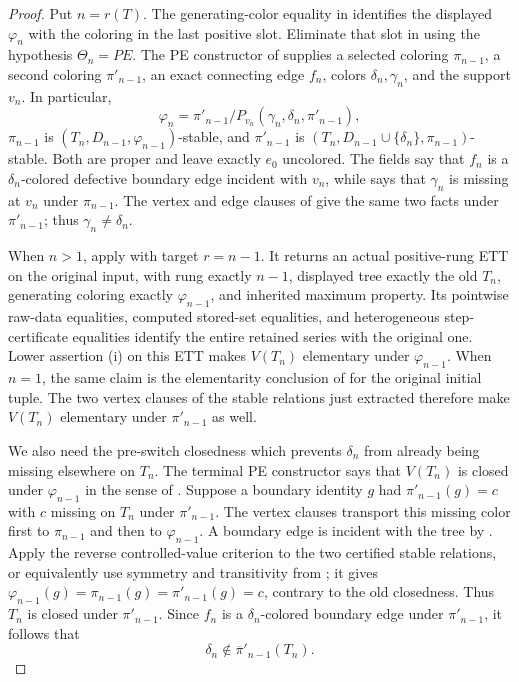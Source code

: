 \begin{proof}
Put $n=r(T)$.  The generating-color equality in
 identifies the displayed $\varphi_n$
with the coloring in the last positive slot.  Eliminate that slot in
 using the hypothesis $\Theta_n=PE$.  The PE
constructor of  supplies a selected coloring
$\pi_{n-1}$, a second coloring $\pi'_{n-1}$, an exact connecting edge
$f_n$, colors $\delta_n,\gamma_n$, and the support $v_n$.  In particular,
\[
 \varphi_n=\pi'_{n-1}/P_{v_n}(\gamma_n,\delta_n,\pi'_{n-1}),   \tag{3}
\]
$\pi_{n-1}$ is $(T_n,D_{n-1},\varphi_{n-1})$-stable, and
$\pi'_{n-1}$ is
$(T_n,D_{n-1}\cup\{\delta_n\},\pi_{n-1})$-stable.  Both are proper
and leave exactly $e_0$ uncolored.  The
 fields say that $f_n$ is a
$\delta_n$-colored defective boundary edge incident with $v_n$, while
 says that $\gamma_n$ is missing at
$v_n$ under $\pi_{n-1}$.  The vertex and edge clauses of
 give the same two facts under $\pi'_{n-1}$;
thus $\gamma_n\ne\delta_n$.

When $n>1$, apply  with target
$r=n-1$.  It returns an actual positive-rung ETT on the original input,
with rung exactly $n-1$, displayed tree exactly the old $T_n$,
generating coloring exactly $\varphi_{n-1}$, and inherited maximum
property.  Its pointwise raw-data equalities, computed stored-set
equalities, and heterogeneous step-certificate equalities identify the
entire retained series with the original one.  Lower assertion (i) on
this ETT makes $V(T_n)$ elementary under $\varphi_{n-1}$.  When $n=1$, the same
claim is the elementarity conclusion of
 for the original initial tuple.  The two
vertex clauses of the stable relations just extracted therefore make
$V(T_n)$ elementary under $\pi'_{n-1}$ as well.

We also need the pre-switch closedness which prevents $\delta_n$ from
already being missing elsewhere on $T_n$.  The terminal PE constructor
says that $V(T_n)$ is closed under $\varphi_{n-1}$ in the sense of
.  Suppose a boundary identity $g$ had
$\pi'_{n-1}(g)=c$ with $c$ missing on $T_n$ under $\pi'_{n-1}$.
The vertex clauses transport this missing color first to $\pi_{n-1}$ and
then to $\varphi_{n-1}$.  A boundary edge is incident with the tree by
.  Apply the reverse controlled-value criterion
 to the two certified stable relations, or equivalently use
symmetry and transitivity from ; it gives
$\varphi_{n-1}(g)=\pi_{n-1}(g)=\pi'_{n-1}(g)=c$, contrary to the old
closedness.  Thus $T_n$ is closed under $\pi'_{n-1}$.  Since $f_n$ is a
$\delta_n$-colored boundary edge under $\pi'_{n-1}$, it follows that
\[
          \delta_n\notin\overline\pi'_{n-1}(T_n).              \tag{4}
\]


\end{proof}
